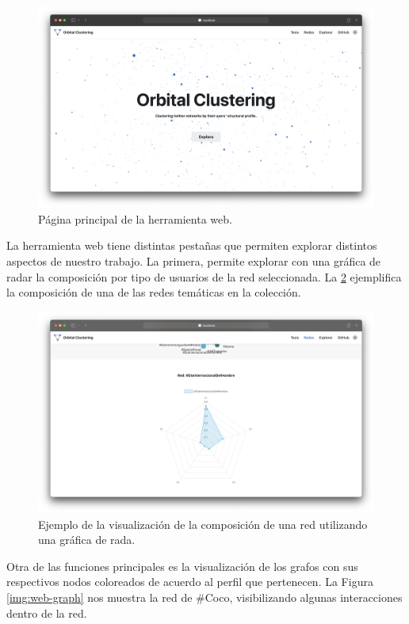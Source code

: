  \begin{figure}
   \centering
   \includegraphics[width=1\textwidth]{images/web-main.png}
    \caption{Página principal de la herramienta web.}
    \label{img:web-main}
\end{figure}

La herramienta web tiene distintas pestañas que permiten explorar distintos aspectos de nuestro trabajo. La primera, permite explorar con una gráfica de radar la composición por tipo de usuarios de la red seleccionada. La \ref{img:web-comp} ejemplifica la composición de una de las redes temáticas en la colección.

 \begin{figure}
   \centering
   \includegraphics[width=1\textwidth]{images/web-comp.png}
    \caption{Ejemplo de la visualización de la composición de una red utilizando una gráfica de rada.}
    \label{img:web-comp}
\end{figure}

Otra de las funciones principales es la visualización de los grafos con sus respectivos nodos coloreados de acuerdo al perfil que pertenecen. La Figura \ref{img:web-graph} nos muestra la red de \#Coco, visibilizando algunas interacciones dentro de la red.

